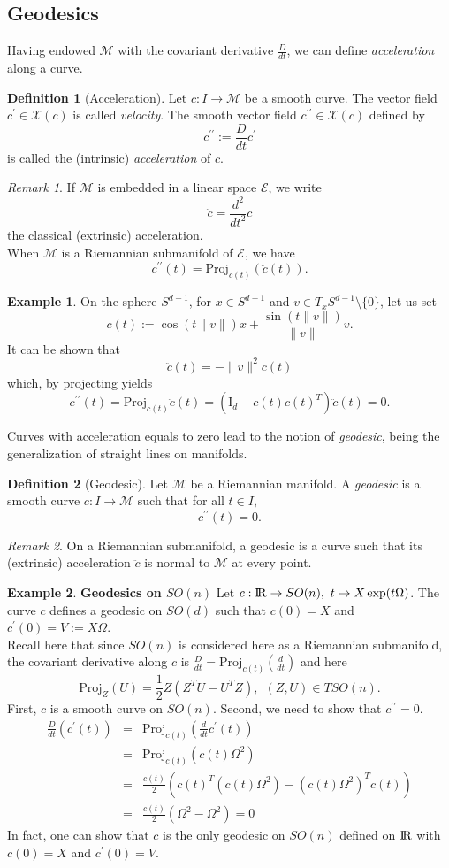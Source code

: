 \documentclass[10pt,a4paper]{book}
\theoremstyle{definition}
\newtheorem{defn}{Definition}[section]
\newtheorem{exm}{Example}[section]
\theoremstyle{plain}
\theoremstyle{remark}
\newtheorem{rmk}{Remark}[section]
\newcommand{\E}{\mathcal{E}}
\newcommand \M {\mathcal{M}}
\newcommand \X {\mathcal{X}}
\def\R{{\rm I\kern-0.16em R}}
\begin{document}
\subsection{Geodesics}
Having endowed $\M$ with the covariant derivative $\frac{D}{dt}$, we can define \emph{acceleration} along a curve.
\begin{defn}[Acceleration]
Let $c:I\to \M$ be a smooth curve. The vector field $c^{\prime}\in \X(c)$ is called \emph{velocity}. The smooth vector field $c^{\prime \prime} \in \X(c)$ defined by
$$c^{\prime \prime}:=\frac{D}{dt}c^{\prime}$$
is called the (intrinsic) \emph{acceleration} of $c$.
\end{defn}
\begin{rmk}
If $\M$ is embedded in a linear space $\E$, we write
$$\ddot{c}=\frac{d^2}{dt^2}c$$
the classical (extrinsic) acceleration.\\ When $\M$ is a Riemannian submanifold of $\E$, we have
$$c^{\prime \prime}(t)=\text{Proj}_{c(t)}(\ddot{c}(t)).$$
\end{rmk}
\begin{exm}
On the sphere $S^{d-1}$, for $x\in S^{d-1}$ and $v\in T_xS^{d-1}\setminus \{0\}$, let us set
$$c(t):=\cos (t\|v\|)x+\frac{\sin(t\|v\|)}{\|v\|}v.$$
It can be shown that
$$\ddot{c}(t)=-\|v\|^2c(t)$$
which, by projecting yields
$$c^{\prime \prime}(t)=\text{Proj}_{c(t)}\ddot{c}(t)=(\text{I}_d-c(t)c(t)^{T})\ddot{c}(t)=0.$$
\end{exm}
Curves with acceleration equals to zero lead to the notion of \emph{geodesic}, being the generalization of straight lines on manifolds.
\begin{defn}[Geodesic]
Let $\M$ be a Riemannian manifold. A \emph{geodesic} is a smooth curve $c:I\to \M$ such that for all $t\in I$,
$$c^{\prime \prime}(t)=0.$$
\end{defn}
\begin{rmk}
On a Riemannian submanifold, a geodesic is a curve such that its (extrinsic) acceleration $\ddot{c}$ is normal to $\M$ at every point.
\end{rmk}
\begin{exm}\textbf{Geodesics on $SO(n)$} Let $c:\R \to SO(n), ~t \mapsto X \exp(t\Omega)$. The curve $c$ defines a geodesic on $SO(d)$ such that $c(0)=X$ and $c^{\prime}(0)=V:=X\Omega$. \\ Recall here that since $SO(n)$ is considered here as a Riemannian submanifold, the covariant derivative along $c$ is $\frac{D}{dt}=\text{Proj}_{c(t)}\left(\frac{d}{dt}\right)$ and here
$$\text{Proj}_Z(U)=\frac{1}{2}Z(Z^TU-U^TZ),~~(Z,U)\in TSO(n).$$
First, $c$ is a smooth curve on $SO(n)$. Second, we need to show that $c^{\prime \prime}=0$. 
\begin{eqnarray*}
\frac{D}{dt}(c^{\prime}(t))&=&\text{Proj}_{c(t)}\left(\frac{d}{dt}c^{\prime}(t)\right)\\
&=&\text{Proj}_{c(t)}(c(t)\Omega^2)\\
&=&\frac{c(t)}{2}(c(t)^{T}(c(t)\Omega^2)-(c(t)\Omega^2)^Tc(t))\\
&=&\frac{c(t)}{2}(\Omega^2-\Omega^2)=0
\end{eqnarray*}
In fact, one can show that $c$ is the only geodesic on $SO(n)$ defined on $\R$ with $c(0)=X$ and $c^{\prime}(0)=V$. 
\end{exm}
\end{document}
